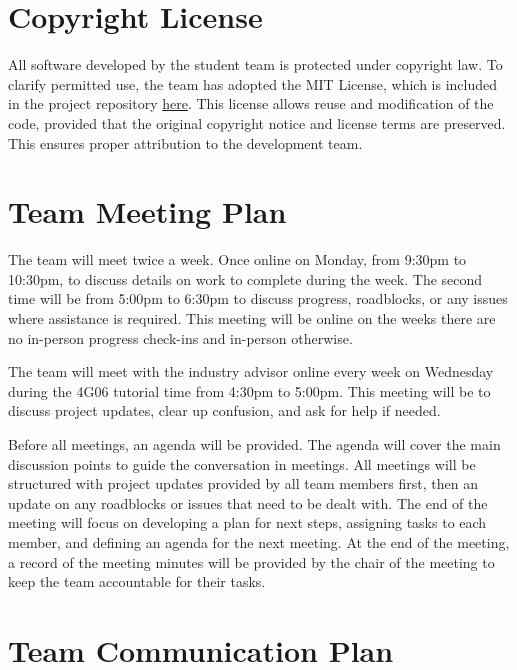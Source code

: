 \documentclass{article}
\begin{document}
\section{Copyright License}

All software developed by the student team is protected under copyright law. 
To clarify permitted use, the team has adopted the MIT License, which is included 
in the project repository
\href{https://github.com/4G06-team12-MacSync/demo-repository/blob/main/LICENSE}{here}. 
This license allows reuse and modification of the code, provided that the 
original copyright notice and license terms are preserved. This ensures proper 
attribution to the development team.

\section{Team Meeting Plan}
The team will meet twice a week. Once online on Monday, from 9:30pm to 10:30pm, to discuss details on work to complete during the week. The second time will be from 5:00pm to 6:30pm to discuss progress, roadblocks, or any issues where assistance is required. This meeting will be online on the weeks there are no in-person progress check-ins and in-person otherwise. \vspace{1em}

The team will meet with the industry advisor online every week on Wednesday during the 4G06 tutorial time from 4:30pm to 5:00pm. This meeting will be to discuss project updates, clear up confusion, and ask for help if needed. \vspace{1em}

Before all meetings, an agenda will be provided. The agenda will cover the main discussion points to guide the conversation in meetings. All meetings will be structured with project updates provided by all team members first, then an update on any roadblocks or issues that need to be dealt with. The end of the meeting will focus on developing a plan for next steps, assigning tasks to each member, and defining an agenda for the next meeting. At the end of the meeting, a record of the meeting minutes will be provided by the chair of the meeting to keep the team accountable for their tasks.





\section{Team Communication Plan}
\end{document}
